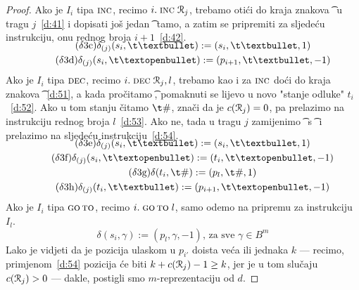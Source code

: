 \begin{proof}
Ako je $I_i$ tipa $\textsc{inc}$, recimo  $i.\;\textsc{inc}\;\mathcal R_{j}$, trebamo otići do kraja znakova \t\textbullet\ u tragu $j$~\eqref{d:41} i dopisati još jedan \t\textbullet\ tamo, a zatim se pripremiti za sljedeću instrukciju, onu rednog broja $i+1$~\eqref{d:42}.
\begin{gather*}
\SwapAboveDisplaySkip
\label{d:41}\tag{$\delta$3c}
    \delta_{(j)}(s_i,\t\textbullet):=(s_i,\t\textbullet,1)\\
\label{d:42}\tag{$\delta$3d}
    \delta_{(j)}(s_i,\t\textopenbullet):=(p_{i+1},\t\textbullet,-1)
\end{gather*}
Ako je $I_i$ tipa $\textsc{dec}$, recimo $i.\;\textsc{dec}\;\mathcal R_{j},l$, trebamo kao i za $\textsc{inc}$ doći do kraja znakova~\t\textbullet~\eqref{d:51}, a kada pročitamo \t\textopenbullet, pomaknuti se lijevo u novo "stanje odluke" $t_i$~\eqref{d:52}. Ako u tom stanju čitamo $\t\#$, znači da je $c(\mathcal R_{j})=0$, pa prelazimo na instrukciju rednog broja $l$~\eqref{d:53}. Ako ne, tada u tragu $j$ zamijenimo \t\textbullet\ s \t\textopenbullet\ i prelazimo na sljedeću instrukciju~\eqref{d:54}.
\begin{gather*}
\SwapAboveDisplaySkip
\label{d:51}\tag{$\delta$3e}
    \delta_{(j)}(s_i,\t\textbullet):=(s_i,\t\textbullet,1)\\
\label{d:52}\tag{$\delta$3f}
    \delta_{(j)}(s_i,\t\textopenbullet):=(t_i,\t\textopenbullet,-1)\\
\label{d:53}\tag{$\delta$3g}
    \delta(t_i,\t\#):=(p_l,\t\#,1)\\
\label{d:54}\tag{$\delta$3h}
    \delta_{(j)}(t_i,\t\textbullet):=(p_{i+1},\t\textopenbullet,-1)
\end{gather*}
Ako je $I_i$ tipa $\textsc{go\,to}$, recimo $i.\;\textsc{go\,to}\;l$, samo odemo na pripremu za instrukciju $I_l$.
\begin{equation*}
\label{d:61}\tag{$\delta$3i}
    \delta(s_i,\gamma):=(p_l,\gamma,-1)\text{, za sve $\gamma\in B^m$}
\end{equation*}
	Lako je vidjeti da je pozicija ulaskom u $p_{i'}$ doista veća ili jednaka $k$ --- recimo, primjenom~\eqref{d:54} pozicija će biti $k+c(\mathcal R_{j})-1\ge k$, jer je u tom slučaju $c(\mathcal R_{j})>0$ --- dakle, postigli smo $m$-reprezentaciju od $d$.
\end{proof}

